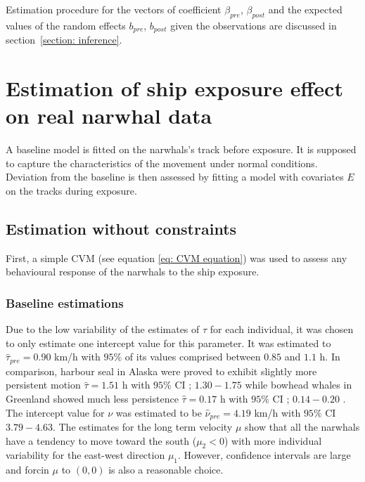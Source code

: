 \documentclass[11pt]{article}
\newcommand {\1}{\mathbb{1}}
\begin{document}
Estimation procedure for the vectors of coefficient $\beta_{pre}$, $\beta_{post}$ and the expected values of the random effects $b_{pre}$, $b_{post}$ given the observations are discussed in section~\ref{section: inference}.\\





\section{Estimation of ship exposure effect on real narwhal data}

A baseline model is fitted on the narwhals's track before exposure. It is supposed to capture the characteristics of the movement under normal conditions. Deviation from the baseline is then assessed by fitting a model with covariates $E$ on the tracks during exposure.

\subsection{Estimation without constraints}

First, a simple CVM (see equation \ref{eq: CVM equation}) was used to assess any behavioural response of the narwhals to the ship exposure.

\subsubsection{Baseline estimations}
Due to the low variability of the estimates of $\tau$ for each individual, it was chosen to only estimate one intercept value for this parameter. It was estimated to $\hat{\tau}_{pre}=0.90 $ km/h with $95 \%$ of its values comprised between $0.85$ and $1.1$ h.
In comparison, harbour seal in Alaska were proved to exhibit slightly more persistent motion $\hat{\tau}=1.51$ h with $95\%$ CI ; $1.30 -1.75$  \cite{johnson_continuous_2008} while bowhead whales in Greenland showed much less persistence $\hat{\tau}=0.17$ h with $95\%$ CI ; $0.14 -0.20$  \cite{gurarie_correlated_2017}.
The intercept value for $\nu$ was estimated to be $\hat{\nu}_{pre}=4.19$ km/h with $95\%$ CI $3.79-4.63$.
The estimates for the long term velocity $\mu$ show that all the narwhals have a tendency to move toward the south ($\mu_2<0$) with more individual variability for the east-west direction $\mu_1$. However, confidence intervals are large and  forcin $\mu$ to $(0,0)$ is also a reasonable choice.
\end{document}
